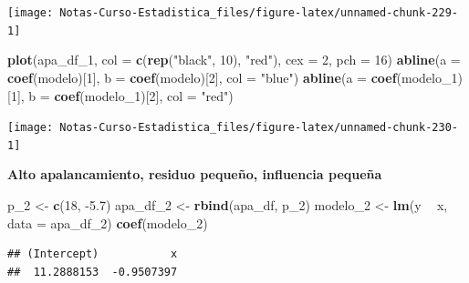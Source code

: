 \documentclass[
  12pt,
]{book}
\newenvironment{Shaded}{\begin{snugshade}}{\end{snugshade}}
\newcommand{\DataTypeTok}[1]{\textcolor[rgb]{0.13,0.29,0.53}{#1}}
\newcommand{\DecValTok}[1]{\textcolor[rgb]{0.00,0.00,0.81}{#1}}
\newcommand{\FloatTok}[1]{\textcolor[rgb]{0.00,0.00,0.81}{#1}}
\newcommand{\KeywordTok}[1]{\textcolor[rgb]{0.13,0.29,0.53}{\textbf{#1}}}
\newcommand{\NormalTok}[1]{#1}
\newcommand{\OperatorTok}[1]{\textcolor[rgb]{0.81,0.36,0.00}{\textbf{#1}}}
\newcommand{\StringTok}[1]{\textcolor[rgb]{0.31,0.60,0.02}{#1}}
\theoremstyle{definition}
\theoremstyle{definition}
\theoremstyle{definition}
\theoremstyle{remark}
\begin{document}
\begin{center}\texttt{[image: Notas-Curso-Estadistica\_files/figure-latex/unnamed-chunk-229-1]} \end{center}

\begin{Shaded}
\begin{Highlighting}[]
\KeywordTok{plot}\NormalTok{(apa_df_}\DecValTok{1}\NormalTok{, }\DataTypeTok{col =} \KeywordTok{c}\NormalTok{(}\KeywordTok{rep}\NormalTok{(}\StringTok{"black"}\NormalTok{, }\DecValTok{10}\NormalTok{), }\StringTok{"red"}\NormalTok{), }\DataTypeTok{cex =} \DecValTok{2}\NormalTok{, }
    \DataTypeTok{pch =} \DecValTok{16}\NormalTok{)}
\KeywordTok{abline}\NormalTok{(}\DataTypeTok{a =} \KeywordTok{coef}\NormalTok{(modelo)[}\DecValTok{1}\NormalTok{], }\DataTypeTok{b =} \KeywordTok{coef}\NormalTok{(modelo)[}\DecValTok{2}\NormalTok{], }\DataTypeTok{col =} \StringTok{"blue"}\NormalTok{)}
\KeywordTok{abline}\NormalTok{(}\DataTypeTok{a =} \KeywordTok{coef}\NormalTok{(modelo_}\DecValTok{1}\NormalTok{)[}\DecValTok{1}\NormalTok{], }\DataTypeTok{b =} \KeywordTok{coef}\NormalTok{(modelo_}\DecValTok{1}\NormalTok{)[}\DecValTok{2}\NormalTok{], }
    \DataTypeTok{col =} \StringTok{"red"}\NormalTok{)}
\end{Highlighting}
\end{Shaded}

\begin{center}\texttt{[image: Notas-Curso-Estadistica\_files/figure-latex/unnamed-chunk-230-1]} \end{center}

\textbf{Alto apalancamiento, residuo pequeño, influencia pequeña}

\begin{Shaded}
\begin{Highlighting}[]
\NormalTok{p_}\DecValTok{2}\NormalTok{ <-}\StringTok{ }\KeywordTok{c}\NormalTok{(}\DecValTok{18}\NormalTok{, }\FloatTok{-5.7}\NormalTok{)}
\NormalTok{apa_df_}\DecValTok{2}\NormalTok{ <-}\StringTok{ }\KeywordTok{rbind}\NormalTok{(apa_df, p_}\DecValTok{2}\NormalTok{)}
\NormalTok{modelo_}\DecValTok{2}\NormalTok{ <-}\StringTok{ }\KeywordTok{lm}\NormalTok{(y }\OperatorTok{~}\StringTok{ }\NormalTok{x, }\DataTypeTok{data =}\NormalTok{ apa_df_}\DecValTok{2}\NormalTok{)}
\KeywordTok{coef}\NormalTok{(modelo_}\DecValTok{2}\NormalTok{)}
\end{Highlighting}
\end{Shaded}

\begin{verbatim}
## (Intercept)           x 
##  11.2888153  -0.9507397
\end{verbatim}
\end{document}
